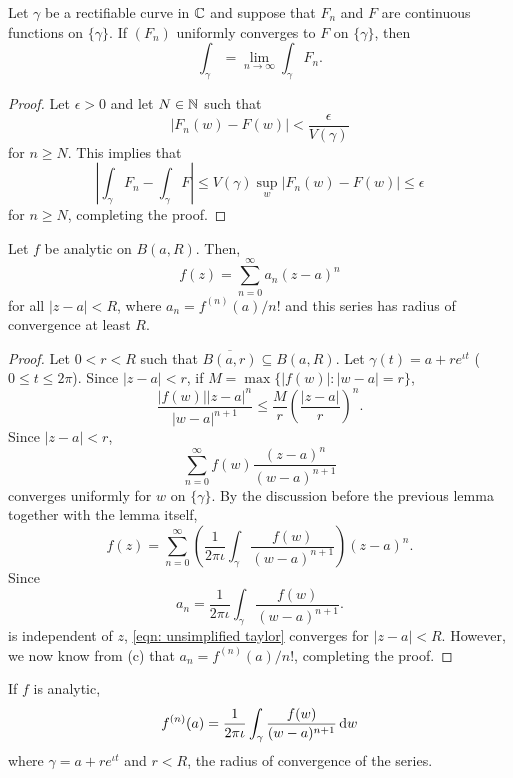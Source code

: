 	\begin{lemma}
		Let $\gamma$ be a rectifiable curve in $\mathbb{C}$ and suppose that $F_n$ and $F$ are continuous functions on $\{\gamma\}$. If $(F_n)$ uniformly converges to $F$ on $\{\gamma\}$, then
		\[ \int_\gamma = \lim_{n\to\infty} \int_\gamma F_n. \]
	\end{lemma}
	\begin{proof}
		Let $\epsilon > 0$ and let $N \in \mathbb{N}$ such that
		\[ |F_n(w) - F(w)| < \frac{\epsilon}{V(\gamma)} \]
		for $n \ge N$. This implies that
		\[ \left| \int_\gamma F_n - \int_\gamma F \right| \le V(\gamma) \sup_{w} |F_n(w) - F(w)| \le \epsilon \]
		for $n \ge N$, completing the proof.
	\end{proof}

	\begin{ftheo}
		Let $f$ be analytic on $B(a,R)$. Then,
		\[ f(z) = \sum_{n=0}^\infty a_n(z-a)^n \]
		for all $|z-a| < R$, where $a_n = f^{(n)}(a)/n!$ and this series has radius of convergence at least $R$.
	\end{ftheo}
	\begin{proof}
		Let $0 < r < R$ such that $\overline{B(a,r)} \subseteq B(a,R)$. Let $\gamma(t) = a + re^{\iota t}$ ($0\le t\le 2\pi$). Since $|z-a| < r$, if $M = \max\{|f(w)| : |w-a| = r\}$,
		\[ \frac{|f(w)||z-a|^n}{|w-a|^{n+1}} \le \frac{M}{r} \left( \frac{|z-a|}{r} \right)^n. \]
		Since $|z-a| < r$,
		\[ \sum_{n=0}^{\infty} f(w) \frac{(z-a)^n}{(w-a)^{n+1}} \]
		converges uniformly for $w$ on $\{\gamma\}$. By the discussion before the previous lemma together with the lemma itself,
		\begin{equation}
			\label{eqn: unsimplified taylor}
			\tag{$*$}
			f(z) = \sum_{n=0}^{\infty} \left(\frac{1}{2\pi\iota} \int_\gamma \frac{f(w)}{(w-a)^{n+1}}\right) (z-a)^n.
		\end{equation}
		Since
		\[ a_n = \frac{1}{2\pi\iota} \int_\gamma \frac{f(w)}{(w-a)^{n+1}}. \]
		is independent of $z$, \eqref{eqn: unsimplified taylor} converges for $|z-a| < R$. However, we now know from (c) that $a_n = f^{(n)}(a)/n!$, completing the proof.
	\end{proof}

	\begin{corollary}
		If $f$ is analytic,
		\[ f^{(n)}(a) = \frac{1}{2\pi\iota} \int_\gamma \frac{f(w)}{(w-a)^{n+1}} \dif w \]
		where $\gamma = a + re^{\iota t}$ and $r < R$, the radius of convergence of the series.
	\end{corollary}

